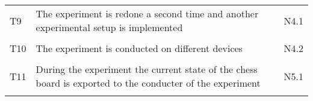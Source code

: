 \begin{table}[htbp]
\begin{tabular}{L{0.04\textwidth}L{0.7\textwidth}L{0.15\textwidth}}
    T9  & The experiment is redone a second time and another experimental setup is implemented                                                     & N4.1                         \\
    & \\
    T10 & The experiment is conducted on different devices                                                                                         & N4.2                         \\
    & \\
    T11 & During the experiment the current state of the chess board is exported to the conducter of the experiment                                & N5.1                         \\ 
    & \\ \hline
    \end{tabular}
    \end{table}


